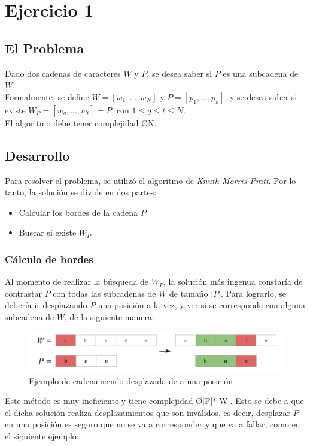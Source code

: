 \section{Ejercicio 1}
\subsection{El Problema}
Dado dos cadenas de caracteres $W$ y $P$, se desea saber si $P$ es una subcadena de $W$.\\
Formalmente, se define $W = [w_1,...,w_N]$ y $P = [p_1,...,p_k]$, y se desea saber si existe $W_P = [w_q,...,w_t] = P$, con $1 \leq q \leq t \leq N$.\\
El algoritmo debe tener complejidad \O{N}.

\subsection{Desarrollo}
Para resolver el problema, se utilizó el algoritmo de \emph{Knuth-Morris-Pratt}.
Por lo tanto, la solución se divide en dos partes:
\begin{itemize}
	\item Calcular los bordes de la cadena $P$
	\item Buscar si existe $W_P$
\end{itemize}

\subsubsection{Cálculo de bordes}
Al momento de realizar la búsqueda de $W_P$, la solución más ingenua constaría de contrastar $P$ con todas las subcadenas de $W$ de tamaño $|P|$. Para lograrlo, se debería ir desplazando $P$ una posición a la vez, y ver si se corresponde con alguna subcadena de $W$, de la siguiente manera:

\begin{figure}[h]
	\centering
	\includegraphics[width=\textwidth]{Imagenes/Ejercicio1/Shift.png}
	\caption{Ejemplo de cadena siendo desplazada de a una posición}
\end{figure}

Este método es muy ineficiente y tiene complejidad \O{|P|*|W|}.
Esto se debe a que el dicha solución realiza desplazamientos que son inválidos, es decir, desplazar $P$ en una posición es seguro que no se va a corresponder y que va a fallar, como en el siguiente ejemplo:

